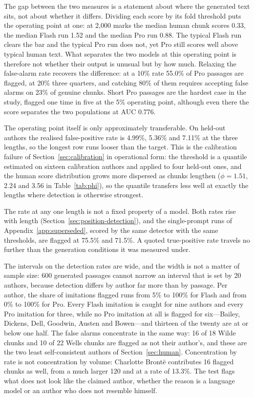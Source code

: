 \documentclass[11pt]{article}
\begin{document}
The gap between the two measures is a statement about where the generated
text sits, not about whether it differs.  Dividing each score by its fold
threshold puts the operating point at one: at 2,000 marks the median
human chunk scores 0.33, the median Flash run 1.52 and the median Pro run
0.88.  The typical Flash run clears the bar and the typical Pro run does
not, yet Pro still scores well above typical human text.  What separates
the two models at this operating point is therefore not whether their
output is unusual but by how much.  Relaxing the false-alarm rate
recovers the difference: at a 10\% rate 55.0\% of Pro passages are
flagged, at 20\% three quarters, and catching 80\% of them requires
accepting false alarms on 23\% of genuine chunks.  Short Pro passages are
the hardest case in the study, flagged one time in five at the 5\%
operating point, although even there the score separates the two
populations at AUC 0.776.

The operating point itself is only approximately transferable.  On
held-out authors the realised false-positive rate is 4.99\%, 5.36\% and
7.11\% at the three lengths, so the longest row runs looser than the
target.  This is the calibration failure of Section~\ref{sec:calibration}
in operational form: the threshold is a quantile estimated on sixteen
calibration authors and applied to four held-out ones, and the human score
distribution grows more dispersed as chunks lengthen (\(\phi = 1.51\),
2.24 and 3.56 in Table~\ref{tab:phi}), so the quantile transfers less well
at exactly the lengths where detection is otherwise strongest.

The rate at any one length is not a fixed property of a model.  Both
rates rise with length (Section~\ref{sec:position-detection}), and the
single-prompt runs of Appendix~\ref{app:superseded}, scored by the same
detector with the same thresholds, are flagged at 75.5\% and 71.5\%.  A
quoted true-positive rate travels no further than the generation
conditions it was measured under.

The intervals on the detection rates are wide, and the width is not a
matter of sample size: 600 generated passages cannot narrow an interval
that is set by 20 authors, because detection differs by author far more
than by passage.  Per author, the share of imitations flagged runs from
5\% to 100\% for Flash and from 0\% to 100\% for Pro.  Every Flash
imitation is caught for nine authors and every Pro imitation for three,
while no Pro imitation at all is flagged for six---Bailey, Dickens, Dell,
Goodwin, Austen and Bowen---and thirteen of the twenty are at or below
one half.  The false alarms concentrate in the same way: 16 of 18
Wilde chunks and 10 of 22 Wells chunks are flagged as not their author's,
and these are the two least self-consistent authors of
Section~\ref{sec:human}.  Concentration by rate is not concentration by
volume: Charlotte Bront\"{e} contributes 16 flagged chunks as well, from a
much larger 120 and at a rate of 13.3\%.  The test flags what does not look like the
claimed author, whether the reason is a language model or an author who
does not resemble himself.
\end{document}
